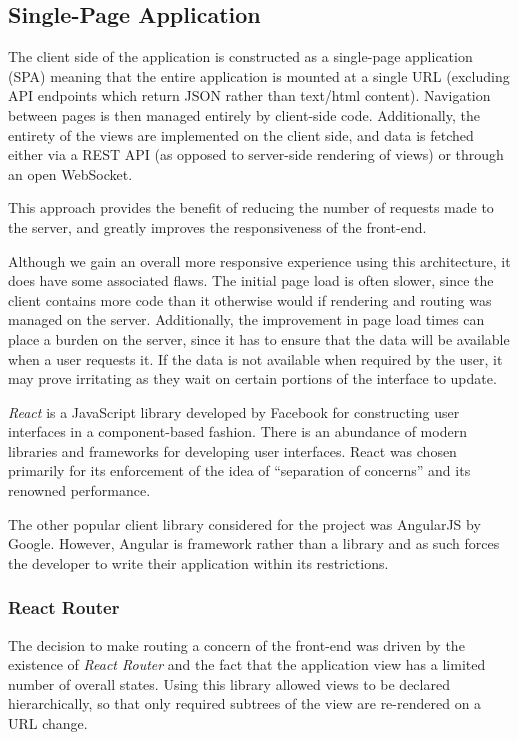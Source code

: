\documentclass{l4proj}
\begin{document}
        \subsection{Single-Page Application}
    The client side of the application is constructed as a single-page application (SPA) meaning that the entire application is mounted at a single URL (excluding API endpoints which return JSON rather than text/html content). Navigation between pages is then managed entirely by client-side code. Additionally, the entirety of the views are implemented on the client side, and data is fetched either via a REST API (as opposed to server-side rendering of views) or through an open WebSocket. 

This approach provides the benefit of reducing the number of requests made to the server, and greatly improves the responsiveness of the front-end. 

Although we gain an overall more responsive experience using this architecture, it does have some associated flaws. The initial page load is often slower, since the client contains more code than it otherwise would if rendering and routing was managed on the server. Additionally, the improvement in page load times can place a burden on the server, since it has to ensure that the data will be available when a user requests it. If the data is not available when required by the user, it may prove irritating as they wait on certain portions of the interface to update.

        \textit{React} is a JavaScript library developed by Facebook for constructing user interfaces in a component-based fashion. There is an abundance of modern libraries and frameworks for developing user interfaces. React was chosen primarily for its enforcement of the idea of ``separation of concerns'' and its renowned performance.
        
        The other popular client library considered for the project was AngularJS by Google. However, Angular is framework rather than a library and as such forces the developer to write their application within its restrictions.

        \subsubsection{React Router}
        The decision to make routing a concern of the front-end was driven by the existence of \textit{React Router} and the fact that the application view has a limited number of overall states. Using this library allowed views to be declared hierarchically, so that only required subtrees of the view are re-rendered on a URL change.
        
\end{document}
